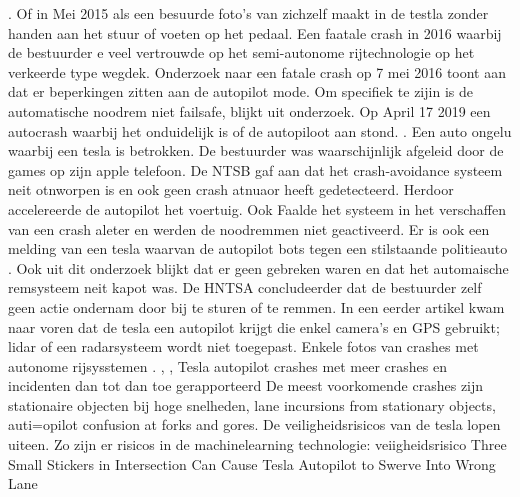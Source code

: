 \cite{oremus21062017fatalTeslaCrash}. Of in 
Mei 2015 als een besuurde foto's van zichzelf maakt in de testla zonder handen aan het stuur of voeten op het pedaal.
\cite{guardian15052021teslacrashHandsOnWheel}
Een faatale crash in 2016 waarbij de bestuurder  e veel vertrouwde op het semi-autonome rijtechnologie op het verkeerde type wegdek.
\cite{Puzzanghera13092017TeslaSharesBlame}
Onderzoek naar een fatale crash op 7 mei 2016 toont aan dat er beperkingen zitten aan de autopilot mode. Om specifiek te zijin is de automatische noodrem niet failsafe, blijkt uit onderzoek.
\cite{jaillet02022017teslaAutopilotLimitations}
\cite{reuters03102019teslaAutoParkingFail}
\cite{dowling23042021}
Op  April 17 2019 een autocrash waarbij het onduidelijk is of de autopiloot aan stond.
\cite{young05112021fatalTeslaReport}. Een auto ongelu waarbij een tesla is betrokken. De bestuurder was waarschijnlijk afgeleid door de games op zijn apple telefoon. De NTSB gaf aan dat het crash-avoidance systeem neit otnworpen is en ook geen crash atnuaor heeft gedetecteerd. Herdoor accelereerde de autopilot  het voertuig. Ook Faalde het systeem in het verschaffen van een crash aleter en werden de noodremmen niet geactiveerd.
\cite{tiungteslasoftwarecrash}
Er is ook een melding van een tesla waarvan de autopilot bots tegen een stilstaande politieauto
\cite{kierstein18032021teslaAutopilotCrashStationary}. Ook uit dit onderzoek blijkt dat er geen gebreken waren en dat het automaische remsysteem neit kapot was. De HNTSA concludeerder dat de bestuurder zelf geen actie ondernam door  bij te sturen of te remmen. In een eerder artikel kwam naar voren dat de tesla een autopilot krijgt die enkel camera's en GPS gebruikt; lidar of een radarsysteem wordt niet toegepast.
\cite{janssen20062017teslacrashdetailflorida}
Enkele fotos van crashes met autonome rijsysstemen \cite{saferoardsCrashesAutonomousvehicles}.
\cite{stephardson18032021revieuwingtesla}
\cite{habib28062016NHTSATeslaReport},
\cite{darkReading17112020TeslaBackup},
\cite{heilweil26022020teslaAutopilot}
Tesla autopilot crashes met meer crashes en incidenten dan tot dan toe gerapporteerd
\cite{teslaFDSCrash}
De meest voorkomende crashes zijn stationaire objecten bij hoge snelheden, lane incursions from stationary objects, auti=opilot confusion at forks and gores.
\cite{teslaCrashesCauses}
\cite{teslacrashOvervieuw}
\cite{tesladeaths}
De veiligheidsrisicos van de tesla lopen uiteen. Zo zijn er risicos in de machinelearning technologie:
veiigheidsrisico Three Small Stickers in Intersection Can Cause Tesla Autopilot to Swerve Into Wrong Lane
